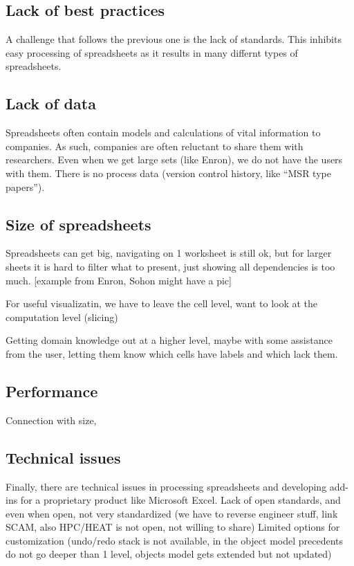 \documentclass[conference]{IEEEtran}
\begin{document}
\subsection{Lack of best practices}
A challenge that follows the previous one is the lack of standards. This inhibits easy processing of spreadsheets as it results in many differnt types of spreadsheets.

\subsection{Lack of data}
Spreadsheets often contain models and calculations of vital information to companies. As such, companies are often reluctant to share them with researchers.  Even when we get large sets (like Enron), we do not have the users with them. There is no process data (version control history, like “MSR type papers”).

\subsection{Size of spreadsheets }
Spreadsheets can get big, navigating on 1 worksheet is still ok, but for larger sheets it is hard to filter what to present, just showing all dependencies is too much. [example from Enron, Sohon might have a pic]

For useful visualizatin, we have to leave the cell level, want to look at the computation level (slicing)

Getting domain knowledge out at a higher level, maybe with some assistance from the user, letting them know which cells have labels and which lack them.

\subsection{Performance}
Connection with size, 

\subsection{Technical issues}
Finally, there are technical issues in processing spreadsheets and developing add-ins for a proprietary product like Microsoft Excel. 
Lack of open standards, and even when open, not very standardized (we have to reverse engineer stuff, link SCAM, also HPC/HEAT is not open, not willing to share)
Limited options for customization (undo/redo stack is not available, in the object model precedents do not go deeper than 1 level, objects model gets extended but not updated)
\end{document}

